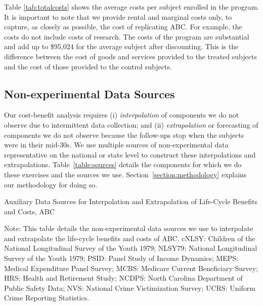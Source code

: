 \noindent Table \ref{tab:totalcosts} shows the average costs per subject enrolled
in the program. It is important to note that we provide rental and marginal costs only, to capture, as closely as possible, the cost of replicating ABC.  For example, the costs do not include costs of research. The costs of the program are substantial and add up to \$95,024 for the average subject after discounting. This is the difference between the cost of goods and services provided to the treated subjects and the cost of those provided to the control subjects. \\

\subsection{Non-experimental Data Sources}

\noindent Our cost-benefit analysis requires (i) \textit{interpolation} of components we do not observe due to intermittent data collection; and (ii) \textit{extrapolation} or forecasting of components we do not observe because the follow-ups stop when the subjects were in their mid-30s. We use multiple sources of non-experimental data representative on the national or state level to construct these interpolations and extrapolations. Table~\ref{table:sources} details the components for which we do these exercises and the sources we use. Section~\ref{section:methodology} explains our methodology for doing so. 

\begin{table}[H]
\begin{threeparttable}
\caption{Auxiliary Data Sources for Interpolation and Extrapolation of Life-Cycle Benefits and Costs, ABC} \label{table:sources}
\footnotesize

\begin{tablenotes}
\footnotesize
Note: This table details the non-experimental data sources we use to interpolate and extrapolate the life-cycle benefits and costs of ABC. cNLSY: Children of the National Longitudinal Survey of the Youth 1979; NLSY79: National Longitudinal Survey of the Youth 1979; PSID: Panel Study of Income Dynamics; MEPS: Medical Expenditure Panel Survey; MCBS: Medicare Current Beneficiary Survey; HRS: Health and Retirement Study; NCDPS: North Carolina Department of Public Safety Data; NVS: National Crime Victimization Survey; UCRS: Uniform Crime Reporting Statistics.
\end{tablenotes}
\end{threeparttable}
\end{table}

